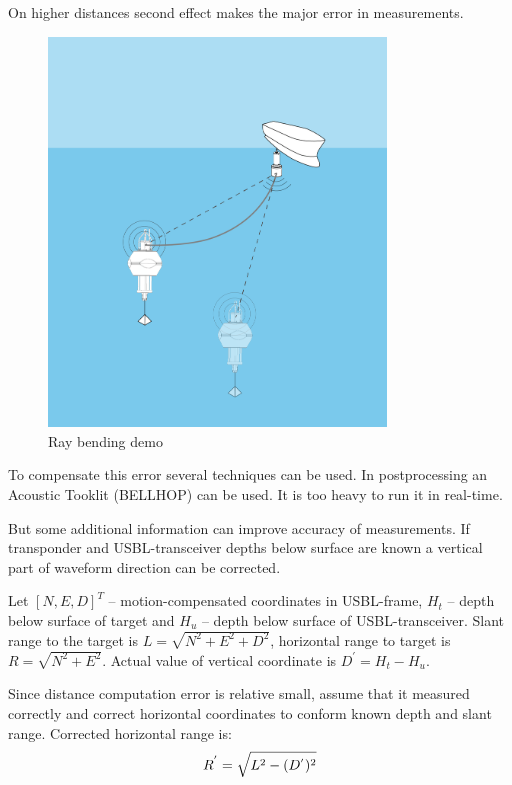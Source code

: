 \documentclass[10pt,letterpaper]{article}
\numberwithin{equation}{section}
\numberwithin{figure}{section}
\numberwithin{table}{section}
\begin{document}
On higher distances second effect makes the major error in measurements.

\begin{figure}
    \centering
    \includegraphics[width=0.8\textwidth]{ray-bending.png}
    \caption{Ray bending demo}
\end{figure}

To compensate this error several techniques can be used. In postprocessing an
Acoustic Tooklit (BELLHOP) can be used. It is too heavy to run it in real-time.

But some additional information can improve accuracy of measurements.
If transponder and USBL-transceiver depths below surface are known a vertical
part of waveform direction can be corrected.

Let $[ N, E, D ]^{T}$ -- motion-compensated coordinates in USBL-frame, $H_{t}$ --
depth below surface of target and $H_{u}$ -- depth below surface of
USBL-transceiver. Slant range to the target is $L = \sqrt{N^2 + E^2 + D^2}$,
horizontal range to target is $R = \sqrt{N^2 + E^2}$. Actual value of vertical
coordinate is $D^{'} = H_{t} - H_{u}$.

Since distance computation error is relative small, assume that it measured
correctly and correct horizontal coordinates to conform known depth and slant range.
Corrected horizontal range is:
\begin{equation}
    R^{'} = \sqrt{L^2 - (D^{'})^2} \\
\end{equation}
\end{document}
